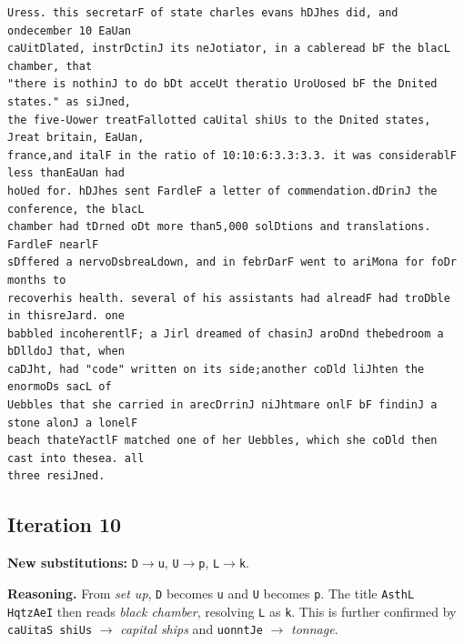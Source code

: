 \documentclass[11pt,a4paper]{article}
\begin{document}
\begin{lstlisting}[style=ciphertext,caption={Complete text after iteration 9}]
Uress. this secretarF of state charles evans hDJhes did, and ondecember 10 EaUan
caUitDlated, instrDctinJ its neJotiator, in a cableread bF the blacL chamber, that
"there is nothinJ to do bDt acceUt theratio UroUosed bF the Dnited states." as siJned,
the five-Uower treatFallotted caUital shiUs to the Dnited states, Jreat britain, EaUan,
france,and italF in the ratio of 10:10:6:3.3:3.3. it was considerablF less thanEaUan had
hoUed for. hDJhes sent FardleF a letter of commendation.dDrinJ the conference, the blacL
chamber had tDrned oDt more than5,000 solDtions and translations. FardleF nearlF
sDffered a nervoDsbreaLdown, and in febrDarF went to ariMona for foDr months to
recoverhis health. several of his assistants had alreadF had troDble in thisreJard. one
babbled incoherentlF; a Jirl dreamed of chasinJ aroDnd thebedroom a bDlldoJ that, when
caDJht, had "code" written on its side;another coDld liJhten the enormoDs sacL of
Uebbles that she carried in arecDrrinJ niJhtmare onlF bF findinJ a stone alonJ a lonelF
beach thateYactlF matched one of her Uebbles, which she coDld then cast into thesea. all
three resiJned.
\end{lstlisting}

\newpage
\subsection{Iteration 10}

\noindent\textbf{New substitutions:} \texttt{D}$\rightarrow$\texttt{u}, \texttt{U}$\rightarrow$\texttt{p}, \texttt{L}$\rightarrow$\texttt{k}.\par
\smallskip
\noindent\textbf{Reasoning.} From \textit{set up}, \texttt{D} becomes \texttt{u} and \texttt{U} becomes \texttt{p}. The title \texttt{AsthL HqtzAeI} then reads \textit{black chamber}, resolving \texttt{L} as \texttt{k}. This is further confirmed by \texttt{caUitaS shiUs} $\rightarrow$ \textit{capital ships} and \texttt{uonntJe} $\rightarrow$ \textit{tonnage}.
\end{document}
